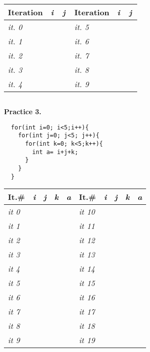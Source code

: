 \documentclass{article}
\begin{document}
\begin{flushleft}
\begin{tabu} to 120mm { | X[l] | X[c] |  X[c]  | X[l] | X[c] |  X[c] | }
  \hline
  \textbf{Iteration}  & \emph{i} & \emph{j} & \textbf{Iteration}  & \emph{i}  & \emph{j} \\
  \hline
  \emph{it. 0}  &  & \ &  \emph{it. 5}  & \ & \  \\
  \hline
  \emph{it. 1} &  \ & \ &  \emph{it. 6}  & \ & \ \\
  \hline
  \emph{it. 2} &   \ &  \ &  \emph{it. 7}  & \ & \ \\
  \hline
  \emph{it. 3} &  \ & \ &  \emph{it. 8}  & \ & \ \\
  \hline
  \emph{it. 4} &  \  & \ &  \emph{it. 9}  & \ & \ \\
  \hline
\end{tabu}

\begin{verbatim}

\end{verbatim}
\noindent \textbf{Practice 3.}\\
\begin{verbatim}
  for(int i=0; i<5;i++){
    for(int j=0; j<5; j++){
      for(int k=0; k<5;k++){
        int a= i+j+k;
      }
    }
  }
\end{verbatim}

\begin{tabu} to 120mm { | X[l] | X[c] |  X[c] | X[c]  | X[c] | X[l] | X[c] | X[c] |  X[c] | X[c] | }
  \hline
  \textbf{It.\#}  & \emph{i} & \emph{j} & \emph{k} & \emph{a} & \textbf{It.\#}  & \emph{i} & \emph{j} & \emph{k} & \emph{a}  \\
  \hline
  \emph{it 0}  &   &  &  &  &  \emph{it 10}  &  &   &  &  \\
  \hline
  \emph{it 1}  &   &  &  &  &  \emph{it 11}  &  &   &  &  \\
  \hline
  \emph{it 2}  &   &  &  &  &  \emph{it 12}  &  &   &  &  \\
  \hline
  \emph{it 3}  &   &  &  &  &  \emph{it 13}  &  &   &  &  \\
  \hline
  \emph{it 4}  &   &  &  &  &  \emph{it 14}  &  &   &  &  \\
  \hline
  \emph{it 5}  &   &  &  &  &  \emph{it 15}  &  &   &  &  \\
  \hline   
  \emph{it 6}  &   &  &  &  &  \emph{it 16}  &  &   &  &  \\
  \hline
  \emph{it 7}  &   &  &  &  &  \emph{it 17}  &  &   &  &  \\
  \hline
  \emph{it 8}  &   &  &  &  &  \emph{it 18}  &  &   &  &  \\
  \hline
  \emph{it 9}  &   &  &  &  &  \emph{it 19}  &  &   &  &  \\
  \hline
    

\end{tabu}
\end{flushleft}
\end{document}
